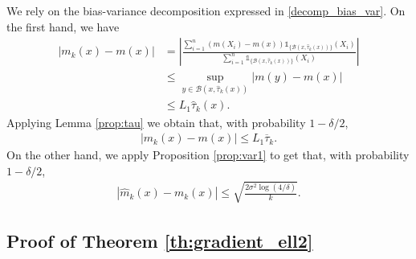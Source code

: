 We rely on the bias-variance decomposition expressed in \eqref{decomp_bias_var}. On the first hand, we have
\begin{align*}
| m _k(x) -  m  (x)| &= \left|\frac{\sum_{i=1} ^ n ( m  (X_i) -   m (x))  \mathds{1}_{\{  \mathcal{B}(x,\hat \tau_{k}(x)) \} } (X_i)  }{\sum_{i=1} ^ n \mathds{1}_{\{  \mathcal{B}(x, \hat \tau_{k}(x)) \} } (X_i)  } \right| \\
& \leq \sup_{y\in \mathcal{B}(x, \hat \tau_k(x) ) } |  m (y) -  m (x)|\\
&\leq  L_1 \hat \tau_{k} (x).
\end{align*}
Applying Lemma \ref{prop:tau} we obtain that, with probability $1-\delta/2$,
\begin{align*}
| m _k(x) - m (x)|  \leq L_1  \overline \tau_{k} .
\end{align*}
On the other hand, we apply Proposition \ref{prop:var1} to get that, with probability $1-\delta/2$,
\begin{align*}
|\hat  m _k(x) -  m _k (x)|\leq \sqrt{ \frac{2  \sigma^2 \log(4/\delta)}{k} } .
\end{align*}

\subsection*{Proof of Theorem \ref{th:gradient_ell2}}

